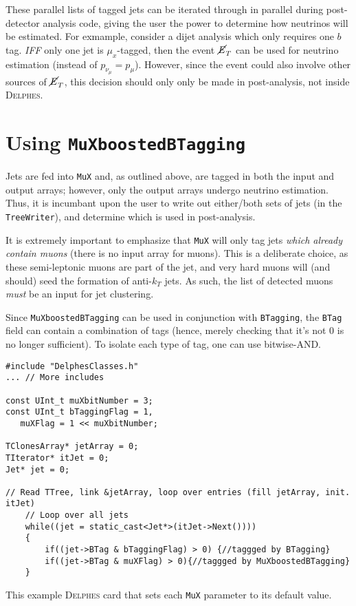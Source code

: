 \documentclass[10pt]{article}
\newcommand{\muX}{$\mu_{x}^{}$}
\newcommand{\muXmodFull}{\texttt{MuXboostedBTagging}}
\newcommand{\muXmod}{\texttt{MuX}}
\newcommand{\delphes}{\textsc{Delphes}}
\newcommand{\MET}{\cancel{E}_{T}^{}}
\newcommand{\pMu}[1][]     {p_{\mu}^{#1}}
\newcommand{\pNu}[1][]     {p_{\nu_{\mu}}^{#1}}
\begin{document}
These parallel lists of tagged jets can be iterated through in parallel during
post-detector analysis code, giving the user the power to determine how
neutrinos will be estimated. For exmample, consider a dijet analysis which
only requires one $b$ tag. \emph{IFF} only one jet is {\muX}-tagged, then the
event $\MET$ can be used for neutrino estimation (instead of $\pNu=\pMu$).
However, since the event could also involve other sources of $\MET$, this
decision should only only be made in post-analysis, not inside {\delphes}.

\section{Using {\muXmodFull}}

Jets are fed into {\muXmod} and, as outlined above, are tagged in both
the input and output arrays; however, only the output arrays undergo neutrino
estimation. Thus, it is incumbant upon the user to write out either/both
sets of jets (in the \texttt{TreeWriter}), and determine which is used in
post-analysis.

It is extremely important to emphasize that {\muXmod} will only tag jets
\emph{which already contain muons} (there is no input array for muons). This is
a deliberate choice, as these semi-leptonic muons are part of the jet, and very
hard muons will (and should) seed the formation of anti-$k_{T}^{}$ jets. As
such, the list of detected muons \emph{must} be an input for jet clustering.

Since {\muXmodFull} can be used in conjunction with \texttt{BTagging}, the
\texttt{BTag} field can contain a combination of tags (hence, merely checking
that it's not 0 is no longer sufficient). To isolate each type of tag, one can
use bitwise-AND.

\begin{lstlisting}
#include "DelphesClasses.h"
... // More includes

const UInt_t muXbitNumber = 3;
const UInt_t bTaggingFlag = 1,
   muXFlag = 1 << muXbitNumber;

TClonesArray* jetArray = 0;
TIterator* itJet = 0;
Jet* jet = 0;

// Read TTree, link &jetArray, loop over entries (fill jetArray, init. itJet)
	// Loop over all jets
	while((jet = static_cast<Jet*>(itJet->Next())))
	{
		if((jet->BTag & bTaggingFlag) > 0) {//taggged by BTagging}
		if((jet->BTag & muXFlag) > 0){//taggged by MuXboostedBTagging}
	}
\end{lstlisting}
%
This example {\delphes} card that sets each {\muXmod} parameter to its default
value.
%
\end{document}
